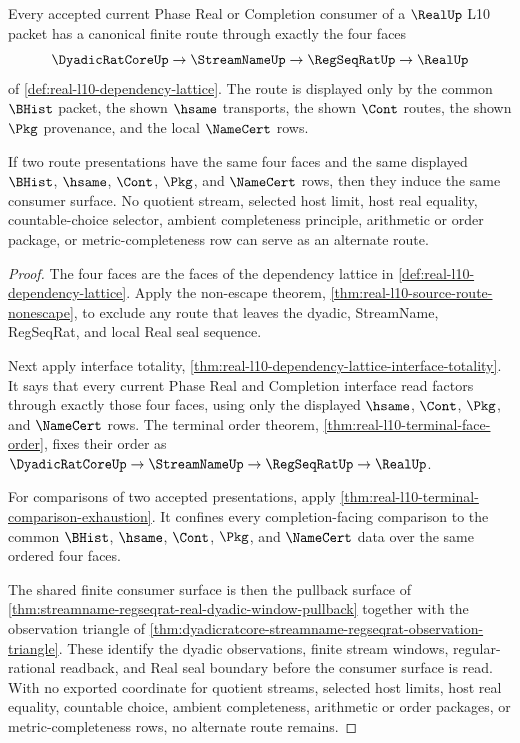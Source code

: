 \begin{theorem}
\label{thm:real-l10-four-face-canonical-route}
Every accepted current Phase Real or Completion consumer of a $\RealUp$ L10
packet has a canonical finite route through exactly the four faces
$$
\DyadicRatCoreUp \to \StreamNameUp \to \RegSeqRatUp \to \RealUp
$$
of \autoref{def:real-l10-dependency-lattice}. The route is displayed only by
the common $\BHist$ packet, the shown $\hsame$ transports, the shown $\Cont$
routes, the shown $\Pkg$ provenance, and the local $\NameCert$ rows.

If two route presentations have the same four faces and the same displayed
$\BHist$, $\hsame$, $\Cont$, $\Pkg$, and $\NameCert$ rows, then they induce
the same consumer surface. No quotient stream, selected host limit, host real
equality, countable-choice selector, ambient completeness principle,
arithmetic or order package, or metric-completeness row can serve as an
alternate route.
\end{theorem}
\begin{proof}
The four faces are the faces of the dependency lattice in
\autoref{def:real-l10-dependency-lattice}. Apply the non-escape theorem,
\autoref{thm:real-l10-source-route-nonescape}, to exclude any route that
leaves the dyadic, StreamName, RegSeqRat, and local Real seal sequence.

Next apply interface totality,
\autoref{thm:real-l10-dependency-lattice-interface-totality}. It says that
every current Phase Real and Completion interface read factors through
exactly those four faces, using only the displayed $\hsame$, $\Cont$, $\Pkg$,
and $\NameCert$ rows. The terminal order theorem,
\autoref{thm:real-l10-terminal-face-order}, fixes their order as
$\DyadicRatCoreUp \to \StreamNameUp \to \RegSeqRatUp \to \RealUp$.

For comparisons of two accepted presentations, apply
\autoref{thm:real-l10-terminal-comparison-exhaustion}. It confines every
completion-facing comparison to the common $\BHist$, $\hsame$, $\Cont$,
$\Pkg$, and $\NameCert$ data over the same ordered four faces.

The shared finite consumer surface is then the pullback surface of
\autoref{thm:streamname-regseqrat-real-dyadic-window-pullback} together with
the observation triangle of
\autoref{thm:dyadicratcore-streamname-regseqrat-observation-triangle}. These
identify the dyadic observations, finite stream windows, regular-rational
readback, and Real seal boundary before the consumer surface is read. With no
exported coordinate for quotient streams, selected host limits, host real
equality, countable choice, ambient completeness, arithmetic or order
packages, or metric-completeness rows, no alternate route remains.
\end{proof}

